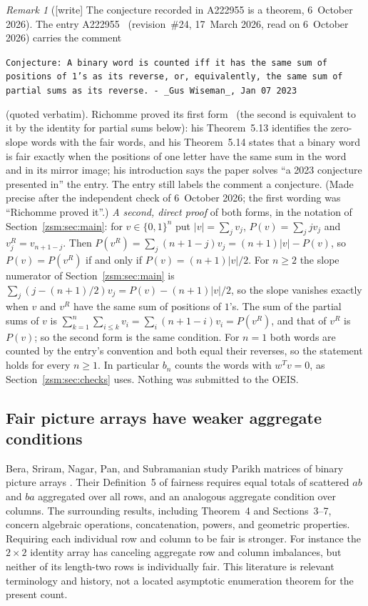 \documentclass[11pt]{article}
\theoremstyle{definition}\newtheorem{definition}[theorem]{Definition}
\theoremstyle{remark}\newtheorem{remark}[theorem]{Remark}
\begin{document}
\begin{remark}[{[write]} The conjecture recorded in A222955 is a theorem, 6~October 2026]\label{zsm:rem:wiseman}
The entry A222955~\cite{oeis955} (revision~\#24, 17~March 2026, read on
6~October 2026) carries the comment
\begin{center}\small
\parbox{0.92\textwidth}{\raggedright\texttt{Conjecture: A binary word is counted iff it has the same sum of positions of 1's as its reverse, or, equivalently, the same sum of partial sums as its reverse. - \_Gus Wiseman\_, Jan 07 2023}}
\end{center}
(quoted verbatim). Richomme proved its first form~\cite{richomme} (the
second is equivalent to it by the identity for partial sums below): his
Theorem~5.13
identifies the zero-slope words with the fair words, and his Theorem~5.14
states that a binary word is fair exactly when the positions of one letter
have the same sum in the word and in its mirror image; his introduction says
the paper
solves ``a 2023 conjecture presented in'' the entry. The entry still labels
the comment a conjecture. \textup{(Made precise after the independent check
of 6~October 2026; the first wording was ``Richomme proved it''.)} \emph{A second, direct proof} of both forms, in
the notation of Section~\ref{zsm:sec:main}: for $v\in\{0,1\}^n$ put
$|v|=\sum_jv_j$, $P(v)=\sum_jjv_j$ and $v^R_j=v_{n+1-j}$. Then
$P(v^R)=\sum_j(n+1-j)v_j=(n+1)|v|-P(v)$, so $P(v)=P(v^R)$ if and only if
$P(v)=(n+1)|v|/2$. For $n\ge2$ the slope numerator of
Section~\ref{zsm:sec:main} is $\sum_j(j-(n+1)/2)v_j=P(v)-(n+1)|v|/2$, so
the slope vanishes exactly when $v$ and $v^R$ have the same sum of
positions of $1$'s. The sum of the partial sums of $v$ is
$\sum_{k=1}^n\sum_{i\le k}v_i=\sum_i(n+1-i)v_i=P(v^R)$, and that of $v^R$ is
$P(v)$; so the second form is the same condition. For $n=1$ both words are
counted by the entry's convention and both equal their reverses, so the
statement holds for every $n\ge1$. In particular $b_n$ counts the words with
$w^Tv=0$, as Section~\ref{zsm:sec:checks} uses. Nothing was submitted to the
OEIS.
\end{remark}

\subsection{Fair picture arrays have weaker aggregate conditions}
Bera, Sriram, Nagar, Pan, and Subramanian study Parikh matrices of binary picture
arrays \cite{bera}. Their Definition~5 of fairness requires equal totals of
scattered $ab$ and $ba$ aggregated over all rows, and an analogous aggregate
condition over columns. The surrounding results, including Theorem~4 and
Sections~3--7, concern algebraic operations, concatenation, powers, and
geometric properties. Requiring each individual row and column to be fair is
stronger. For instance the $2\times2$ identity array has canceling aggregate
row and column imbalances, but neither of its length-two rows is individually
fair. This literature is relevant terminology and history, not a located
asymptotic enumeration theorem for the present count.
\end{document}
